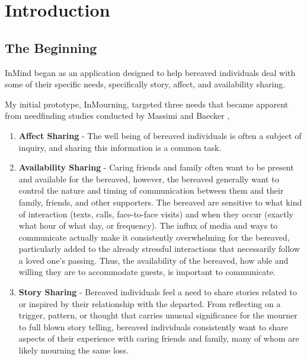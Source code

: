 \chapter{Introduction}
\section{The Beginning}
\label{sec:vision}
  InMind began as an application designed to help bereaved individuals deal with
  some of their specific needs, specifically story, affect, and availability sharing.

  My initial prototype, InMourning, targeted three needs that became apparent
  from needfinding studies conducted by Massimi and
  Baecker \cite{mm11a, mm10, mm13},

  \begin{enumerate}
  \item \textbf{Affect Sharing} - The well being of bereaved individuals is often a subject
    of inquiry, and sharing this information is a common task.
  \item \textbf{Availability Sharing} -
    Caring friends and family often want to be present
    and available for the bereaved, however,
    the bereaved generally want to control the nature and timing of communication between
    them and their family, friends, and other supporters.
    The bereaved are sensitive to what kind
    of interaction (texts, calls, face-to-face visits) and when they occur (exactly
    what hour of what day, or frequency). The influx of media and ways to
    communicate actually make it consistently overwhelming for the bereaved,
    particularly added to the already stressful interactions that necessarily
    follow a loved one's passing.
    Thus, the availability of the bereaved, how able and willing they are
    to accommodate guests, is important to communicate.
  \item \textbf{Story Sharing} - Bereaved individuals feel a need to share stories related to
    or inspired by their relationship with the departed.
    From reflecting on a trigger, pattern, or thought that carries unusual
    significance for the mourner to full blown story telling, bereaved individuals
    consistently want to share aspects of their experience with caring friends and
    family, many of whom are likely mourning the same loss.
  \end{enumerate}

